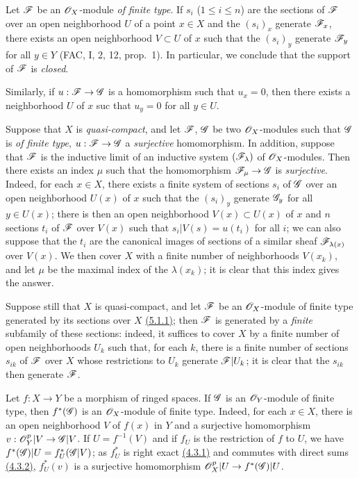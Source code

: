 \begin{env}[5.2.2]
\label{env-0.5.2.2}
Let $\mathscr{F}$ be an $\mathscr{O}_X$-module {\em of finite type}. If $s_i$ ($1\leqslant i\leqslant n$)
are the sections of $\mathscr{F}$ over an open neighborhood $U$ of a point $x\in X$ and the
$(s_i)_x$ generate $\mathscr{F}_x$, there exists an open neighborhood $V\subset U$ of $x$ such
that the $(s_i)_y$ generate $\mathscr{F}_y$ for all $y\in Y$ (FAC, I, 2, 12, prop.~1). In
particular, we conclude that the support of $\mathscr{F}$ is {\em closed}.

Similarly, if $u:\mathscr{F}\to\mathscr{G}$ is a homomorphism such that $u_x=0$, then there exists a
neighborhood $U$ of $x$ suc that $u_y=0$ for all $y\in U$.
\end{env}

\begin{env}[5.2.3]
\label{env-0.5.2.3}
Suppose that $X$ is {\em quasi-compact}, and let $\mathscr{F}$, $\mathscr{G}$ be two $\mathscr{O}_X$-modules
such that $\mathscr{G}$ is {\em of finite type}, $u:\mathscr{F}\to\mathscr{G}$ a {\em surjective}
homomorphism. In addition, suppose that $\mathscr{F}$ is the inductive limit of an inductive
system $(\mathscr{F}_\lambda)$ of $\mathscr{O}_X$-modules. Then there exists an index $\mu$ such that the
homomorphism $\mathscr{F}_\mu\to\mathscr{G}$ is {\em surjective}. Indeed, for each $x\in X$, there
exists a finite system of sections $s_i$ of $\mathscr{G}$ over an open neighborhood $U(x)$ of $x$
such that the $(s_i)_y$ generate $\mathscr{G}_y$ for all $y\in U(x)$; there is then an open
neighborhood $V(x)\subset U(x)$ of $x$ and $n$ sections $t_i$ of $\mathscr{F}$ over $V(x)$ such
that $s_i|V(s)=u(t_i)$ for all $i$; we can also suppose that the $t_i$ are the canonical
images of sections of a similar sheaf $\mathscr{F}_{\lambda(x)}$ over $V(x)$. We then cover $X$
with a finite number of neighborhoods $V(x_k)$, and let $\mu$ be the maximal index of the
$\lambda(x_k)$; it is clear that this index gives the answer.

Suppose still that $X$ is quasi-compact, and let $\mathscr{F}$ be an $\mathscr{O}_X$-module of finite type
generated by its sections over $X$ \hyperref[env-0.5.1.1]{(5.1.1)}; then $\mathscr{F}$ is generated by a
{\em finite} subfamily of these sections: indeed, it suffices to cover $X$ by a finite
number of open neighborhoods $U_k$ such that, for each $k$, there is a finite number of
sections $s_{ik}$ of $\mathscr{F}$ over $X$ whose restrictions to $U_k$ generate $\mathscr{F}|U_k$; it
is clear that the $s_{ik}$ then generate $\mathscr{F}$.
\end{env}

\begin{env}[5.2.4]
\label{env-0.5.2.4}
Let $f:X\to Y$ be a morphism of ringed spaces. If $\mathscr{G}$ is an $\mathscr{O}_Y$-module of finite
type, then $f^*(\mathscr{G})$ is an $\mathscr{O}_X$-module of finite type. Indeed, for each $x\in X$,
there is an open neighborhood $V$ of $f(x)$ in $Y$ and a surjective homomorphism
$v:\mathscr{O}_Y^p|V\to\mathscr{G}|V$. If $U=f^{-1}(V)$ and if $f_U$ is the restriction of $f$ to $U$, we
have $f^*(\mathscr{G})|U=f_U^*(\mathscr{G}|V)$; as $f_U^*$ is right exact \hyperref[env-0.4.3.1]{(4.3.1)} and
commutes with direct sums \hyperref[env-0.4.3.2]{(4.3.2)}, $f_U^*(v)$ is a surjective homomorphism
$\mathscr{O}_X^p|U\to f^*(\mathscr{G})|U$.
\end{env}

